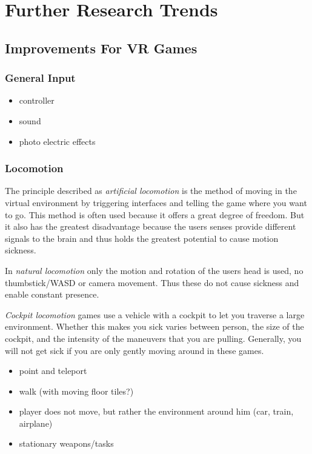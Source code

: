 \section{Further Research Trends}
\subsection{Improvements For VR Games}
\subsubsection{General Input}

\begin{itemize}
	\item controller
	\item sound
	\item photo electric effects
\end{itemize}

\subsubsection{Locomotion}
\label{sec:locomotion}

The principle described as \textit{artificial locomotion} is the method of moving in the virtual environment by triggering interfaces and telling the game where you want to go. This method is often used because it offers a great degree of freedom. But it also has the greatest disadvantage because the users senses provide different signals to the brain and thus holds the greatest potential to cause motion sickness.

In \textit{natural locomotion} only the motion and rotation of the users head is used, no thumbstick/WASD or camera movement. Thus these do not cause sickness and enable constant presence.

\textit{Cockpit locomotion} games use a vehicle with a cockpit to let you traverse a large environment. Whether this makes you sick varies between person, the size of the cockpit, and the intensity of the maneuvers that you are pulling. Generally, you will not get sick if you are only gently moving around in these games. 

\begin{itemize}
	\item point and teleport
	\item walk (with moving floor tiles?)
	\item player does not move, but rather the environment around him (car, train, airplane)
	\item stationary weapons/tasks
\end{itemize}

